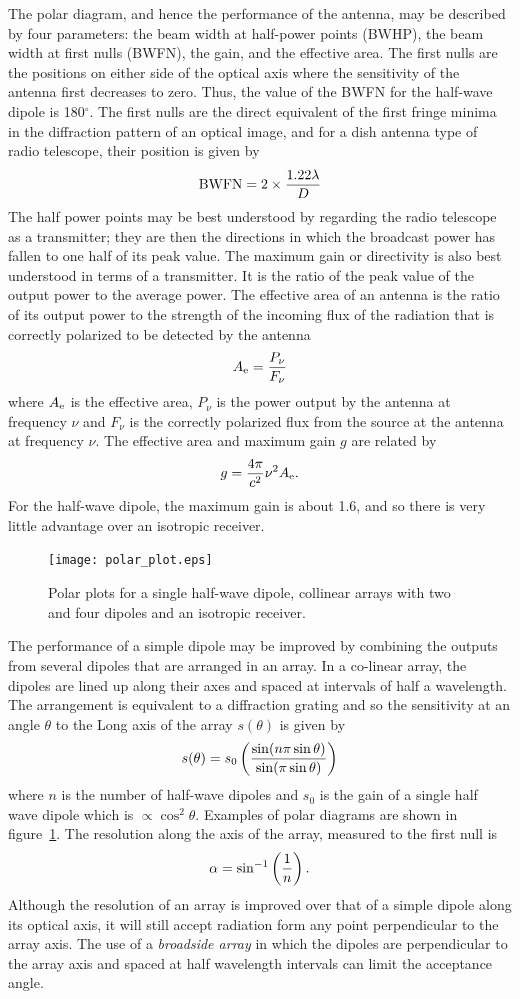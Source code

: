 The polar diagram, and hence the performance of the antenna, may be described
by four parameters: the beam width at half-power points (BWHP), the 
beam width at first nulls (BWFN), the gain, and the effective area. The first
nulls are the positions on either side of the optical axis where the 
sensitivity of the antenna first decreases to zero. Thus, the value of the 
BWFN for the half-wave dipole is 180$^{\circ}$. The first nulls are the direct 
equivalent of the first fringe minima in the diffraction pattern of an optical
image, and for a dish antenna type of radio telescope, their position is given
by 
\[
{\rm BWFN}=2\times{1.22\lambda\over D}
\]
The half power points may be best understood by regarding the radio telescope
as a transmitter; they are then the directions in which the broadcast power
has fallen to one half of its peak value. The maximum gain or directivity
is also best understood in terms of a transmitter. It is the ratio of the 
peak value of the output power to the average power. The effective area of 
an antenna is the ratio of its output power to the strength of the incoming
flux of the radiation that is correctly polarized to be detected by the antenna
\[
A_{\rm e}={P_\nu\over F_\nu}
\]
where $A_{\rm e}$ is the effective area, $P_\nu$ is the power output by the 
antenna at frequency $\nu$ and $F_\nu$ is the correctly polarized flux from the
source at the antenna at frequency $\nu$. The effective area and maximum gain
$g$ are related by 
\[
g={4\pi\over c^2}\nu^2A_{\rm e}.
\]
For the half-wave dipole, the maximum gain is about 1.6, and so there is very
little advantage over an isotropic receiver. 

\begin{figure}[h]
  \centering
	\texttt{[image: polar\_plot.eps]}
  \caption{Polar plots for a single half-wave dipole, collinear arrays with two and four 
dipoles and an isotropic receiver.}
  \label{fig:polar_plot}
\end{figure}

The performance of a simple dipole may be improved by combining the 
outputs from several dipoles that are arranged in an array. In a co-linear 
array, the dipoles are lined up along their axes and spaced at intervals
of half a wavelength. The arrangement is equivalent to a diffraction
grating and so the sensitivity at an angle $\theta$ to the Long axis
of the array $s(\theta)$ is given by
\[
s(\theta)=s_0\left({\sin(n\pi\sin\theta)\over\sin(\pi\sin\theta)}\right)
\]
where $n$ is the number of half-wave dipoles and $s_0$ is the gain of a single
half wave dipole which is $\propto \cos^2\theta$. 
Examples of polar diagrams are shown in figure~\ref{fig:polar_plot}.
The resolution along the axis of the array, measured to the
first null is 
\[
\alpha=\sin^{-1}\left(1\over n\right).
\]
Although the resolution of an array is improved over that of a simple dipole along 
its optical axis, it will still accept radiation form any point perpendicular to the array
axis. The use of a {\it broadside array} in which the dipoles are perpendicular to the 
array axis and spaced at half wavelength intervals can limit the acceptance angle. 

